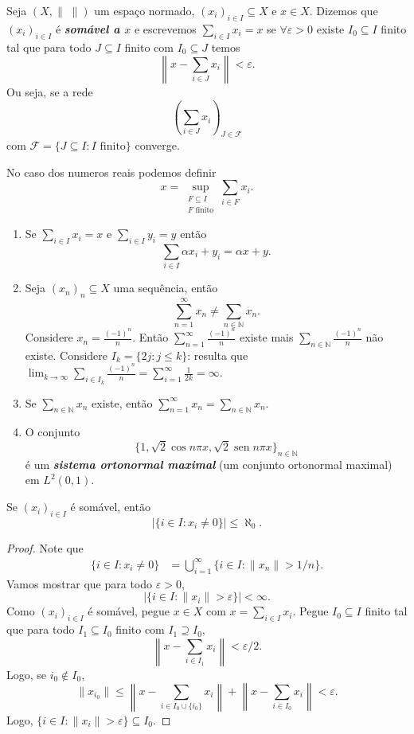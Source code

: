 \documentclass[portuguese]{article}
\theoremstyle{definition}
\newcommand{\N}{\mathbb{N}}
\DeclareMathOperator{\sen}{sen}
\begin{document}
\begin{defn}
	Seja $(X,\|\;\|)$ um espaço normado, $(x_i)_{i\in I}\subseteq X$ e $x\in X$. Dizemos que $(x_i)_{i\in I}$ é \textbf{\textit{somável a $x$}} e escrevemos $\sum_{i\in I}x_i=x$ se $\forall \varepsilon>0$ existe $I_0\subseteq I$ finito tal que para todo $J\subseteq I$ finito com $I_0\subseteq J$ temos
	\[\left\|x-\sum_{i\in J}x_i\right\|<\varepsilon.\]
	Ou seja, se a rede
	\[\left(\sum_{i\in J}x_i\right)_{J\in\mathcal{F}}\]
	com $\mathcal{F}=\{J\subseteq I:I\text{ finito}\}$ converge.
\end{defn}
\begin{obs}
	No caso dos numeros reais podemos definir
	\[x=\sup_{\substack{F\subseteq I\\F\text{ finito}}}\sum_{i\in F}x_i.\]
\end{obs}
\begin{exer*}\leavevmode
	\begin{enumerate}
		\item Se $\sum_{i\in I}x_i=x$ e $\sum_{i\in I}y_i=y$ então
		\[\sum_{i\in I}\alpha x_i+y_i=\alpha x+y.\]
		\item Seja $(x_n)_n\subseteq X$ uma sequência, então
		\[\sum_{n=1}^\infty x_n\neq\sum_{n\in\N}x_n.\]
		Considere $x_n=\frac{(-1)^n}{n}$. Então $\sum_{n=1}^\infty\frac{(-1)^n}{n}$ existe mais $\sum_{n\in\N}\frac{(-1)^n}{n}$ não existe. Considere $I_k=\{2j:j\leq k\}$: resulta que $\lim_{k\to\infty}\sum_{i\in I_k}\frac{(-1)^n}{n}=\sum_{i=1}^\infty\frac{1}{2k}=\infty$.
		\item Se $\sum_{n\in \N}x_n$ existe, então $\sum_{n=1}^\infty x_n=\sum_{n\in\N}x_n$.
		\item O conjunto
		\[\{1,\sqrt{2}\cos n\pi x,\sqrt{2}\sen n\pi x\}_{n\in\N}\]
		é um \textbf{\textit{sistema ortonormal maximal}} (um conjunto ortonormal maximal) em $L^2(0,1)$.
	\end{enumerate}
\end{exer*}
\begin{prop}
	Se $(x_i)_{i\in I}$ é somável, então
	\[|\{i\in I:x_i\neq0\}|\leq\aleph_0.\]
\end{prop}
\begin{proof}
	Note que 
	\begin{align*}
		\{i\in I:x_i\neq0\}&=\bigcup_{i=1}^\infty\{i\in I:\|x_n\|>1/n\}.
	\end{align*}
	Vamos mostrar que para todo $\varepsilon>0$,
	\[|\{i\in I:\|x_i\|>\varepsilon\}|<\infty.\]
	Como $(x_i)_{i\in I}$ é somável, pegue $x\in X$ com $x=\sum_{i\in I}x_i$. Pegue $I_0\subseteq I$ finito tal que para todo $I_1\subseteq I_0$ finito com $I_1\supseteq I_0$,
	\[\left\|x-\sum_{i\in I_1}x_i\right\|<\varepsilon/2.\]
	Logo, se $i_0\notin I_0$,
	\[\|x_{i_0}\|\leq\left\|x-\sum_{i\in I_0\cup\{i_0\}}x_i\right\|+\left\|x-\sum_{i\in I_0}x_i\right\|<\varepsilon.\]
	Logo, $\{i\in I:\|x_i\|>\varepsilon\}\subseteq I_0$.
\end{proof}
\end{document}
